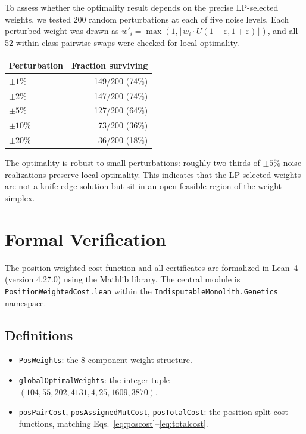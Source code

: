 \documentclass[11pt,twocolumn]{article}
\begin{document}
To assess whether the optimality result depends on the precise LP-selected
weights, we tested 200 random perturbations at each of five noise levels.
Each perturbed weight was drawn as
$w'_i = \max(1, \lfloor w_i \cdot U(1-\varepsilon, 1+\varepsilon)
\rfloor)$, and all 52 within-class pairwise swaps were checked for
local optimality.

\begin{center}
\small
\begin{tabular}{@{}lr@{}}
\toprule
Perturbation & Fraction surviving \\
\midrule
$\pm 1\%$ & 149/200 (74\%) \\
$\pm 2\%$ & 147/200 (74\%) \\
$\pm 5\%$ & 127/200 (64\%) \\
$\pm 10\%$ & 73/200 (36\%) \\
$\pm 20\%$ & 36/200 (18\%) \\
\bottomrule
\end{tabular}
\end{center}

The optimality is robust to small perturbations: roughly two-thirds of
$\pm 5\%$ noise realizations preserve local optimality. This indicates
that the LP-selected weights are not a knife-edge solution but sit in
an open feasible region of the weight simplex.

\section{Formal Verification}

The position-weighted cost function and all certificates are formalized in
Lean~4 (version 4.27.0) using the Mathlib library. The central module is
\texttt{PositionWeightedCost.lean} within the
\texttt{IndisputableMonolith.Genetics} namespace.

\subsection{Definitions}

\begin{itemize}
\item \texttt{PosWeights}: the 8-component weight structure.
\item \texttt{globalOptimalWeights}: the integer tuple
  $(104, 55, 202, 4131, 4, 25, 1609, 3870)$.
\item \texttt{posPairCost}, \texttt{posAssignedMutCost},
  \texttt{posTotalCost}: the position-split cost functions, matching
  Eqs.~\eqref{eq:poscost}--\eqref{eq:totalcost}.
\end{itemize}
\end{document}
